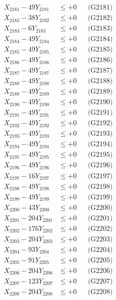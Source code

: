 \documentclass[a4paper,10pt]{article}
\begin{document}
{\begin{align}
X_{2181} - 49Y_{2181} &\leq +0 && \text{(G2181)} \\
X_{2182} - 38Y_{2182} &\leq +0 && \text{(G2182)} \\
X_{2183} - 6Y_{2183} &\leq +0 && \text{(G2183)} \\
X_{2184} - 49Y_{2184} &\leq +0 && \text{(G2184)} \\
X_{2185} - 49Y_{2185} &\leq +0 && \text{(G2185)} \\
X_{2186} - 49Y_{2186} &\leq +0 && \text{(G2186)} \\
X_{2187} - 49Y_{2187} &\leq +0 && \text{(G2187)} \\
X_{2188} - 49Y_{2188} &\leq +0 && \text{(G2188)} \\
X_{2189} - 49Y_{2189} &\leq +0 && \text{(G2189)} \\
X_{2190} - 49Y_{2190} &\leq +0 && \text{(G2190)} \\
\allowbreak
X_{2191} - 49Y_{2191} &\leq +0 && \text{(G2191)} \\
X_{2192} - 49Y_{2192} &\leq +0 && \text{(G2192)} \\
X_{2193} - 49Y_{2193} &\leq +0 && \text{(G2193)} \\
X_{2194} - 49Y_{2194} &\leq +0 && \text{(G2194)} \\
X_{2195} - 49Y_{2195} &\leq +0 && \text{(G2195)} \\
X_{2196} - 49Y_{2196} &\leq +0 && \text{(G2196)} \\
X_{2197} - 16Y_{2197} &\leq +0 && \text{(G2197)} \\
X_{2198} - 49Y_{2198} &\leq +0 && \text{(G2198)} \\
X_{2199} - 49Y_{2199} &\leq +0 && \text{(G2199)} \\
X_{2200} - 43Y_{2200} &\leq +0 && \text{(G2200)} \\
\allowbreak
X_{2201} - 204Y_{2201} &\leq +0 && \text{(G2201)} \\
X_{2202} - 176Y_{2202} &\leq +0 && \text{(G2202)} \\
X_{2203} - 204Y_{2203} &\leq +0 && \text{(G2203)} \\
X_{2204} - 93Y_{2204} &\leq +0 && \text{(G2204)} \\
X_{2205} - 91Y_{2205} &\leq +0 && \text{(G2205)} \\
X_{2206} - 204Y_{2206} &\leq +0 && \text{(G2206)} \\
X_{2207} - 123Y_{2207} &\leq +0 && \text{(G2207)} \\
X_{2208} - 204Y_{2208} &\leq +0 && \text{(G2208)} \\

\end{align}}
\end{document}
